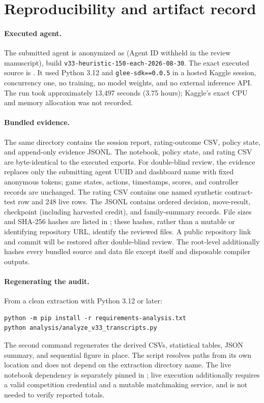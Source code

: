 \section{Reproducibility and artifact record}
\label{app:reproducibility}

\paragraph{Executed agent.}
The submitted agent is anonymized as \AgentName{} (Agent ID withheld in the
review manuscript), build
\texttt{v33-heuristic-150-each-2026-08-30}. The exact executed source is
.
It used Python 3.12 and \texttt{glee-sdk==0.0.5} in a hosted Kaggle session,
concurrency one, no training, no model weights, and no external inference API.
The run took approximately 13,497 seconds (3.75 hours); Kaggle's exact CPU and
memory allocation was not recorded.

\paragraph{Bundled evidence.}
The same directory contains the session report, rating-outcome CSV,
policy state, and append-only evidence JSONL. The notebook, policy state, and
rating CSV are byte-identical to the executed exports. For double-blind review,
the evidence replaces only the submitting agent UUID and dashboard name with
fixed anonymous tokens; game states, actions, timestamps, scores, and controller
records are unchanged. The rating CSV contains one named
synthetic contract-test row and 248 live rows. The JSONL contains ordered
decision, move-result, checkpoint (including harvested credit), and
family-summary records. File
sizes and SHA-256 hashes are listed in
; these hashes, rather than a
mutable or identifying repository URL, identify the reviewed files. A public
repository link and commit will be restored after double-blind review. The
root-level  additionally hashes every bundled
source and data file except itself and disposable compiler outputs.

\paragraph{Regenerating the audit.}
From a clean extraction with Python 3.12 or later:
\begin{verbatim}
python -m pip install -r requirements-analysis.txt
python analysis/analyze_v33_transcripts.py
\end{verbatim}
The second command regenerates the derived CSVs, statistical tables, JSON
summary, and sequential figure in place. The script resolves paths from its own
location and does not depend on the extraction directory name. The live
notebook dependency is separately pinned in ; live
execution additionally requires a valid competition credential and a mutable
matchmaking service, and is not needed to verify reported totals.

